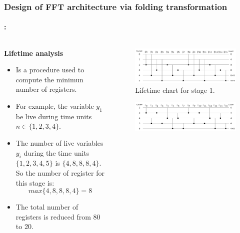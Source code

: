 \begin{frame}
	\frametitle{\textbf{Design of FFT architecture via folding transformation}}
	\framesubtitle{\secname : \subsecname}
	\vspace{-0.5cm}
	 \begin{columns}[t,onlytextwidth]
	      \begin{column}{0.5\linewidth}
			\begin{block}{\centering \textbf{Lifetime analysis}}
				\begin{itemize}\justifying\footnotesize
					\item Is a procedure used to compute the minimun number of registers. \vfill
					\item For example, the variable $y_1$ be live during time units $n \in \{1,2,3,4\}$.
					\item The number of live variables $y_i$ during the time units $\{1,2,3,4,5\}$ is $\{4,8,8,8,4\}$. So the number of register for this stage is: \vfill
					\begin{equation*}
						max\{4,8,8,8,4\} = 8
					\end{equation*}
					\item The total number of registers is reduced from 80 to 20. \vfill
		       	\end{itemize}
			\end{block}
   		  \end{column}
   		  \begin{column}{0.5\linewidth}
   		  	 \vspace{-0.5cm}
   			\begin{figure}[h!] \centering
	    		\includegraphics[width=0.40\paperwidth]{./image/life_chart_a.png}
	    		\caption{\footnotesize Lifetime chart for stage 1.}
	    	\end{figure}
	    	\vspace{-1cm}
	    	\begin{figure}[h!] \centering
	    		\includegraphics[width=0.40\paperwidth]{./image/life_chart_b.png}

\end{figure}
\end{column}
\end{columns}
\end{frame}
